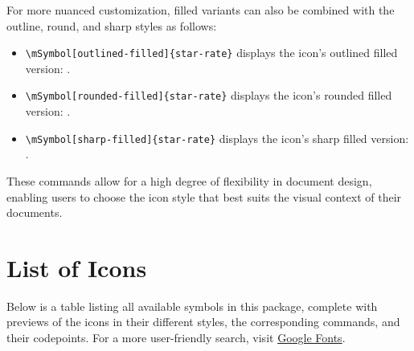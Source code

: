 \documentclass[11pt]{article}
\begin{document}
For more nuanced customization, filled variants can also be combined with the outline, round, and sharp styles as follows:

\begin{itemize}
    \item \texttt{\textbackslash mSymbol[outlined-filled]\{star-rate\}} displays the icon's outlined filled version: .
    \item \texttt{\textbackslash mSymbol[rounded-filled]\{star-rate\}} displays the icon's rounded filled version: .
    \item \texttt{\textbackslash mSymbol[sharp-filled]\{star-rate\}} displays the icon's sharp filled version: .
\end{itemize}

These commands allow for a high degree of flexibility in document design, enabling users to choose the icon style that best suits the visual context of their documents.

\section{List of Icons}

Below is a table listing all available symbols in this package, complete with previews of the icons in their different styles, the corresponding commands, and their codepoints. For a more user-friendly search, visit \href{https://fonts.google.com/icons}{Google Fonts}.


\end{document}
